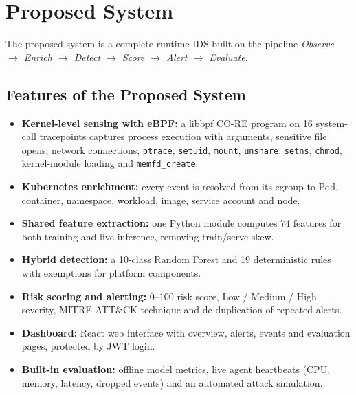 \section{Proposed System}

The proposed system is a complete runtime IDS built on the pipeline
\emph{Observe $\rightarrow$ Enrich $\rightarrow$ Detect $\rightarrow$ Score $\rightarrow$
Alert $\rightarrow$ Evaluate}.

\subsection{Features of the Proposed System}
\begin{itemize}
    \item \textbf{Kernel-level sensing with eBPF:} a libbpf CO-RE program on 16
          system-call tracepoints captures process execution with arguments, sensitive
          file opens, network connections, \texttt{ptrace}, \texttt{setuid},
          \texttt{mount}, \texttt{unshare}, \texttt{setns}, \texttt{chmod}, kernel-module
          loading and \texttt{memfd\_create}.
    \item \textbf{Kubernetes enrichment:} every event is resolved from its cgroup to Pod,
          container, namespace, workload, image, service account and node.
    \item \textbf{Shared feature extraction:} one Python module computes 74 features for
          both training and live inference, removing train/serve skew.
    \item \textbf{Hybrid detection:} a 10-class Random Forest and 19 deterministic rules
          with exemptions for platform components.
    \item \textbf{Risk scoring and alerting:} 0--100 risk score, Low / Medium / High
          severity, MITRE ATT\&CK technique and de-duplication of repeated alerts.
    \item \textbf{Dashboard:} React web interface with overview, alerts, events and
          evaluation pages, protected by JWT login.
    \item \textbf{Built-in evaluation:} offline model metrics, live agent heartbeats
          (CPU, memory, latency, dropped events) and an automated attack simulation.
\end{itemize}

